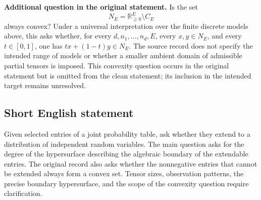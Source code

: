 \documentclass[11pt]{article}
\newcommand{\R}{\mathbb{R}}
\begin{document}
\textbf{Additional question in the original statement.} Is the set
\[
N_E=\R_{\geq0}^{E}\setminus C_E
\]
always convex? Under a universal interpretation over the finite discrete models above, this asks whether, for every \(d,n_1,\ldots,n_d,E\), every \(x,y\in N_E\), and every \(t\in[0,1]\), one has \(tx+(1-t)y\in N_E\). The source record does not specify the intended range of models or whether a smaller ambient domain of admissible partial tensors is imposed. This convexity question occurs in the original statement but is omitted from the clean statement; its inclusion in the intended target remains unresolved.
\subsection{Short English statement}
Given selected entries of a joint probability table, ask whether they extend to a distribution of independent random variables. The main question asks for the degree of the hypersurface describing the algebraic boundary of the extendable entries. The original record also asks whether the nonnegative entries that cannot be extended always form a convex set. Tensor sizes, observation patterns, the precise boundary hypersurface, and the scope of the convexity question require clarification.
\end{document}
